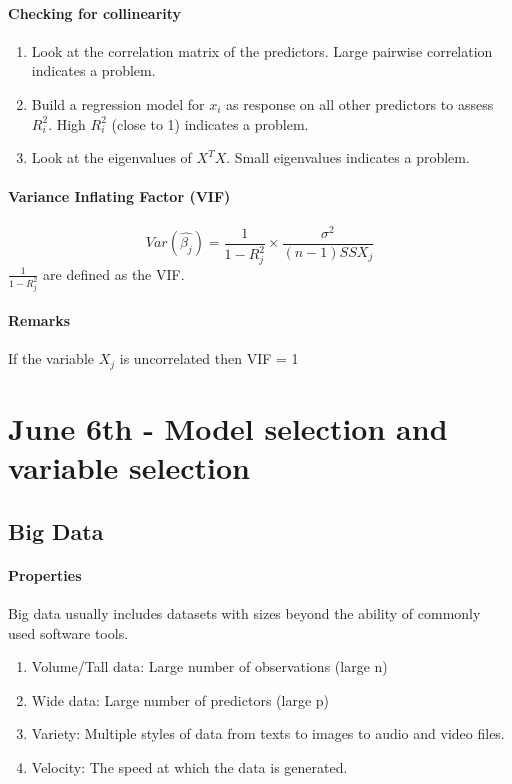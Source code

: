 \documentclass[11pt]{article}
\begin{document}
\paragraph{Checking for collinearity}
\begin{enumerate}
	\item Look at the correlation matrix of the predictors. Large pairwise correlation indicates a problem.
	\item Build a regression model for $x_i$ as response on all other predictors to assess $R_i^2$. High $R_i^2$ (close to 1) indicates a problem.
	\item Look at the eigenvalues of $X^TX$. Small eigenvalues indicates a problem.
\end{enumerate}

\paragraph{Variance Inflating Factor (VIF)}
$$Var(\hat{\beta_j}) = \frac{1}{1-R_j^2} \times \frac{\sigma^2}{(n-1)SSX_j}$$
$\frac{1}{1-R_j^2}$ are defined as the VIF.

\paragraph{Remarks}
If the variable $X_j$ is uncorrelated then VIF = 1


\section{June 6th - Model selection and variable selection}
\subsection{Big Data}
\paragraph{Properties}
Big data usually includes datasets with sizes beyond the ability of commonly used software tools.
\begin{enumerate}
	\item Volume/Tall data: Large number of observations (large n)
	\item Wide data: Large number of predictors (large p)
	\item Variety: Multiple styles of data from texts to images to audio and video files.
	\item Velocity: The speed at which the data is generated.
\end{enumerate}
\end{document}

